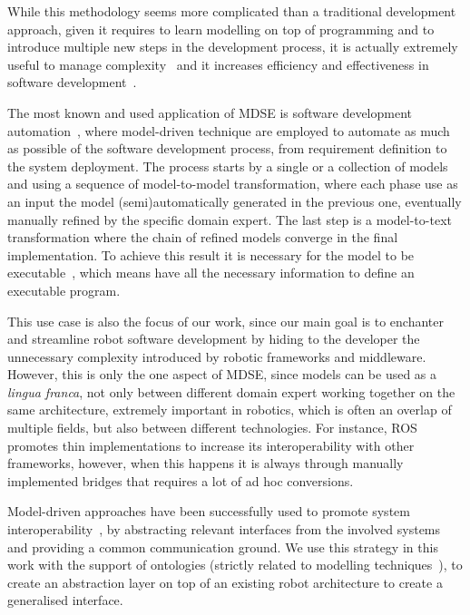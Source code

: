 While this methodology seems more complicated than a traditional development approach, given it requires to learn modelling on top of programming and to introduce multiple new steps in the development process, it is actually extremely useful to manage complexity~\cite{selic2003pragmatics} and it increases efficiency and effectiveness in software development~\cite{acerbis2007developing}.

The most known and used application of MDSE is software development automation~\cite{sendall2003model}, where model-driven technique are employed to automate as much as possible of the software development process, from requirement definition to the system deployment. The process starts by a single or a collection of models and using a sequence of model-to-model transformation, where each phase use as an input the model (semi)automatically generated in the previous one, eventually manually refined by the specific domain expert. The last step is a model-to-text transformation where the chain of refined models converge in the final implementation. To achieve this result it is necessary for the model to be executable~\cite{mellor2002executable}, which means have all the necessary information to define an executable program.

This use case is also the focus of our work, since our main goal is to enchanter and streamline robot software development by hiding to the developer the unnecessary complexity introduced by robotic frameworks and middleware. However, this is only the one aspect of MDSE, since models can be used as a \textit{lingua franca}, not only between different domain expert working together on the same architecture, extremely important in robotics, which is often an overlap of multiple fields, but also between different technologies. For instance, ROS promotes thin implementations to increase its interoperability with other frameworks, however, when this happens it is always through manually implemented bridges that requires a lot of ad hoc conversions.

Model-driven approaches have been successfully used to promote system interoperability~\cite{chungoora2013model}, by abstracting relevant interfaces from the involved systems and providing a common communication ground. We use this strategy in this work with the support of ontologies (strictly related to modelling techniques~\cite{guizzardi2007ontology}), to create an abstraction layer on top of an existing robot architecture to create a generalised interface.


